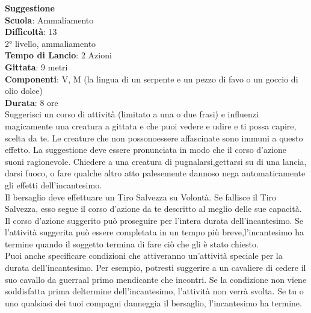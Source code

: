 \begin{multicols}{2}
\medskip\textbf{Suggestione}\\
\textbf{Scuola}: Ammaliamento\\
\textbf{Difficoltà}:  13\\
2° livello, ammaliamento\\
\textbf{Tempo di Lancio}: 2 Azioni\\
\textbf{Gittata}: 9 metri\\
\textbf{Componenti}: V, M (la lingua di un serpente e un pezzo di favo o un goccio di olio dolce)\\
\textbf{Durata}: 8 ore \\
Suggerisci un corso di attività (limitato a una o due frasi) e influenzi magicamente una creatura a gittata e che puoi vedere e udire e ti possa capire, scelta da te. Le creature che non possonoessere affascinate sono immuni a questo effetto. La suggestione deve essere  pronunciata in modo che il corso d’azione suoni ragionevole. Chiedere a una creatura di pugnalarsi,gettarsi su di  una lancia, darsi fuoco, o fare qualche altro atto palesemente dannoso nega automaticamente  gli effetti dell'incantesimo.\\
Il bersaglio deve effettuare un Tiro Salvezza su Volontà. Se fallisce il Tiro Salvezza, esso segue il corso d’azione da te descritto al meglio delle sue capacità. Il corso d’azione suggerito può proseguire per l’intera durata dell'incantesimo. Se l’attività suggerita può essere completata in un tempo più breve,l'incantesimo ha termine quando il soggetto termina di fare ciò che gli è stato chiesto.\\
Puoi anche specificare condizioni che attiveranno un'attività speciale per la durata dell'incantesimo. Per esempio, potresti suggerire a un cavaliere di cedere il suo cavallo da guerraal primo mendicante che incontri.  Se la condizione non viene soddisfatta prima deltermine  dell'incantesimo, l’attività non verrà svolta. Se tu o uno qualsiasi dei tuoi compagni danneggia il bersaglio, l'incantesimo ha termine.


\end{multicols}
